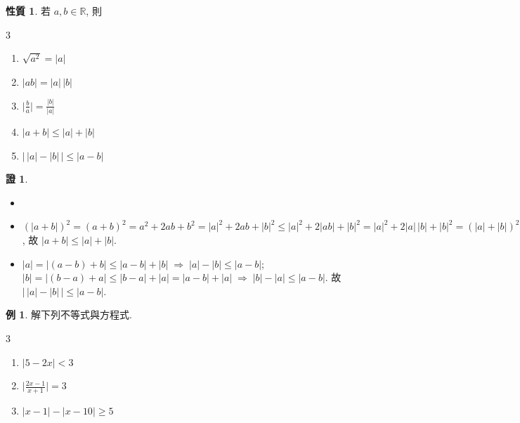 \documentclass[12pt]{extarticle}
\newcommand{\ds}{\displaystyle}
\newcommand{\ie}{\;\Longrightarrow\;}
\theoremstyle{definition}
\newtheorem*{prp}{性質}
\newtheorem*{ex}{例}
\newtheorem*{prf}{證}
\begin{document}
\begin{prp}
  若 $a, b\in\mathbb{R}$, 則
  \setlength{\columnsep}{-20mm}
  \begin{multicols}{3}
    \begin{enumerate}\setlength\itemsep{0em}
      \item $\ds \sqrt{a^2} = |a|$
      \item $\ds |a b| = |a|\,|b|$
      \item $\ds \Big|\frac{b}{a}\Big| = \frac{|b|}{|a|}$
      \item $\ds |a + b|\leqslant|a| + |b|$
      \item $\ds \big|\,|a| - |b|\,\big|\leqslant|a - b|$
    \end{enumerate}
  \end{multicols}
\end{prp}

\begin{prf}
  \begin{itemize}\setlength\itemsep{0em}
    \item[]
    \item $\ds (|a + b|)^2 = (a + b)^2 = a^2 + 2 a b + b^2 = |a|^2 + 2 a b + |b|^2 \leqslant |a|^2 + 2 |a b| + |b|^2 = |a|^2 + 2 |a|\,|b| + |b|^2 = (|a| + |b|)^2$, 故 $\ds |a + b|\leqslant|a| + |b|$. 
    \item $\ds |a| = |(a - b) + b| \leqslant |a - b| + |b| \ie |a| - |b| \leqslant |a - b|$;  $\ds |b| = |(b - a) + a| \leqslant |b - a| + |a| = |a - b| + |a| \ie |b| - |a| \leqslant |a - b|$.  故 $\ds \big|\,|a| - |b|\,\big|\leqslant|a - b|$. 
  \end{itemize}
\end{prf}

\begin{ex}
  解下列不等式與方程式. 
  \setlength{\columnsep}{-20mm}
  \begin{multicols}{3}
    \begin{enumerate}\setlength\itemsep{0em}
      \item $\ds |5 - 2x| < 3$
      \item $\ds \Big|\frac{2 x - 1}{x + 1}\Big| = 3$
      \item $\ds |x - 1| - |x - 10|\geqslant 5$
    \end{enumerate}
  \end{multicols}
\end{ex}
\end{document}
